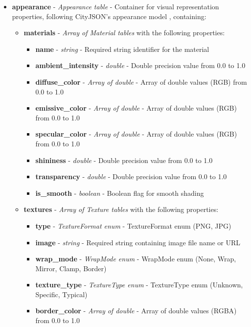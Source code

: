\begin{itemize}
  \item \textbf{appearance} - \textit{Appearance table} - Container for visual representation properties, following CityJSON's appearance model \citep{cityjson_spec}, containing:
    \begin{itemize}
      \item \textbf{materials} - \textit{Array of Material tables} with the following properties:
        \begin{itemize}
          \item \textbf{name} - \textit{string} - Required string identifier for the material
          \item \textbf{ambient\_intensity} - \textit{double} - Double precision value from 0.0 to 1.0
          \item \textbf{diffuse\_color} - \textit{Array of double} - Array of double values (RGB) from 0.0 to 1.0
          \item \textbf{emissive\_color} - \textit{Array of double} - Array of double values (RGB) from 0.0 to 1.0
          \item \textbf{specular\_color} - \textit{Array of double} - Array of double values (RGB) from 0.0 to 1.0
          \item \textbf{shininess} - \textit{double} - Double precision value from 0.0 to 1.0
          \item \textbf{transparency} - \textit{double} - Double precision value from 0.0 to 1.0
          \item \textbf{is\_smooth} - \textit{boolean} - Boolean flag for smooth shading
        \end{itemize}

      \item \textbf{textures} - \textit{Array of Texture tables} with the following properties:
        \begin{itemize}
          \item \textbf{type} - \textit{TextureFormat enum} - TextureFormat enum (PNG, JPG)
          \item \textbf{image} - \textit{string} - Required string containing image file name or URL
          \item \textbf{wrap\_mode} - \textit{WrapMode enum} - WrapMode enum (None, Wrap, Mirror, Clamp, Border)
          \item \textbf{texture\_type} - \textit{TextureType enum} - TextureType enum (Unknown, Specific, Typical)
          \item \textbf{border\_color} - \textit{Array of double} - Array of double values (RGBA) from 0.0 to 1.0
        \end{itemize}


\end{itemize}
\end{itemize}

